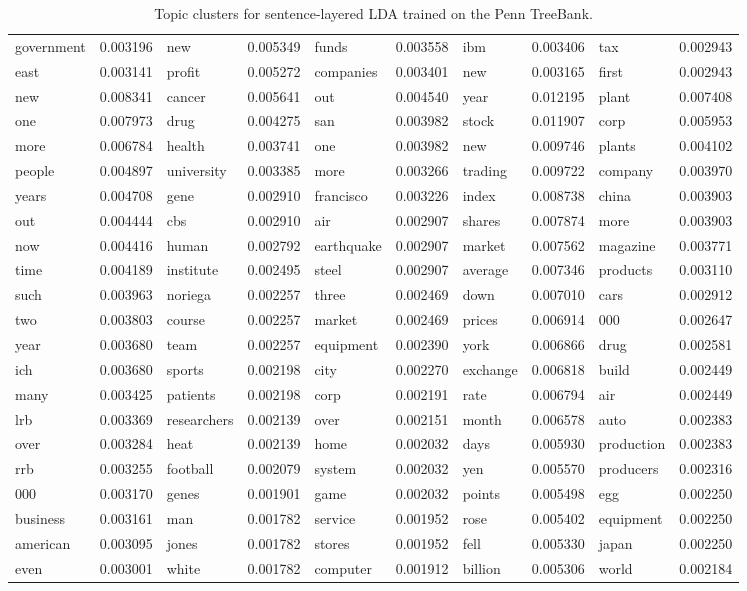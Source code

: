 \begin{table}[!ht]
\begin{tabular}{llllllllll}
government & 0.003196 & new & 0.005349 & funds & 0.003558 & ibm & 0.003406 & tax & 0.002943\\
east & 0.003141 & profit & 0.005272 & companies & 0.003401 & new & 0.003165 & first & 0.002943\\
\hline
new & 0.008341 & cancer & 0.005641 & out & 0.004540 & year & 0.012195 & plant & 0.007408\\
one & 0.007973 & drug & 0.004275 & san & 0.003982 & stock & 0.011907 & corp & 0.005953\\
more & 0.006784 & health & 0.003741 & one & 0.003982 & new & 0.009746 & plants & 0.004102\\
people & 0.004897 & university & 0.003385 & more & 0.003266 & trading & 0.009722 & company & 0.003970\\
years & 0.004708 & gene & 0.002910 & francisco & 0.003226 & index & 0.008738 & china & 0.003903\\
out & 0.004444 & cbs & 0.002910 & air & 0.002907 & shares & 0.007874 & more & 0.003903\\
now & 0.004416 & human & 0.002792 & earthquake & 0.002907 & market & 0.007562 & magazine & 0.003771\\
time & 0.004189 & institute & 0.002495 & steel & 0.002907 & average & 0.007346 & products & 0.003110\\
such & 0.003963 & noriega & 0.002257 & three & 0.002469 & down & 0.007010 & cars & 0.002912\\
two & 0.003803 & course & 0.002257 & market & 0.002469 & prices & 0.006914 & 000 & 0.002647\\
year & 0.003680 & team & 0.002257 & equipment & 0.002390 & york & 0.006866 & drug & 0.002581\\
ich & 0.003680 & sports & 0.002198 & city & 0.002270 & exchange & 0.006818 & build & 0.002449\\
many & 0.003425 & patients & 0.002198 & corp & 0.002191 & rate & 0.006794 & air & 0.002449\\
lrb & 0.003369 & researchers & 0.002139 & over & 0.002151 & month & 0.006578 & auto & 0.002383\\
over & 0.003284 & heat & 0.002139 & home & 0.002032 & days & 0.005930 & production & 0.002383\\
rrb & 0.003255 & football & 0.002079 & system & 0.002032 & yen & 0.005570 & producers & 0.002316\\
000 & 0.003170 & genes & 0.001901 & game & 0.002032 & points & 0.005498 & egg & 0.002250\\
business & 0.003161 & man & 0.001782 & service & 0.001952 & rose & 0.005402 & equipment & 0.002250\\
american & 0.003095 & jones & 0.001782 & stores & 0.001952 & fell & 0.005330 & japan & 0.002250\\
even & 0.003001 & white & 0.001782 & computer & 0.001912 & billion & 0.005306 & world & 0.002184\\
  \end{tabular}
  \caption{Topic clusters for sentence-layered LDA trained on the Penn TreeBank.}
  \label{t:topic-cluster-slda}
\end{table}


